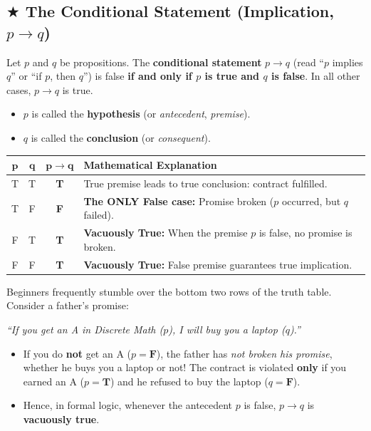 \documentclass[11pt,a4paper]{article}
\begin{document}
\subsection{\texorpdfstring{$\bigstar$ }{*}The Conditional Statement (Implication, \texorpdfstring{$p \rightarrow q$}{p -> q})}
\begin{defbox}
Let $p$ and $q$ be propositions. The \textbf{conditional statement} $p \rightarrow q$ (read ``$p$ implies $q$'' or ``if $p$, then $q$'') is false \textbf{if and only if $p$ is true and $q$ is false}. In all other cases, $p \rightarrow q$ is true.
\begin{itemize}
    \item $p$ is called the \textbf{hypothesis} (or \textit{antecedent}, \textit{premise}).
    \item $q$ is called the \textbf{conclusion} (or \textit{consequent}).
\end{itemize}
\end{defbox}

\begin{center}
\renewcommand{\arraystretch}{1.25}
\begin{tabular}{|c|c|c|l|}
\hline
\rowcolor{navy!15} $\mathbf{p}$ & $\mathbf{q}$ & $\mathbf{p \rightarrow q}$ & \textbf{Mathematical Explanation} \\
\hline
T & T & \textbf{T} & True premise leads to true conclusion: contract fulfilled. \\
T & F & \textbf{F} & \textbf{The ONLY False case:} Promise broken ($p$ occurred, but $q$ failed). \\
F & T & \textbf{T} & \textbf{Vacuously True:} When the premise $p$ is false, no promise is broken. \\
F & F & \textbf{T} & \textbf{Vacuously True:} False premise guarantees true implication. \\
\hline
\end{tabular}
\end{center}

\begin{warningbox}
Beginners frequently stumble over the bottom two rows of the truth table. Consider a father's promise:
\begin{center}
\textit{``If you get an A in Discrete Math ($p$), I will buy you a laptop ($q$).''}
\end{center}
\begin{itemize}
    \item If you do \textbf{not} get an A ($p = \mathbf{F}$), the father has \textit{not broken his promise}, whether he buys you a laptop or not! The contract is violated \textbf{only} if you earned an A ($p = \mathbf{T}$) and he refused to buy the laptop ($q = \mathbf{F}$).
    \item Hence, in formal logic, whenever the antecedent $p$ is false, $p \rightarrow q$ is \textbf{vacuously true}.
\end{itemize}
\end{warningbox}
\end{document}
